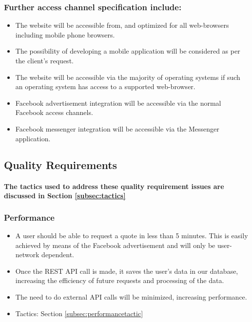 \documentclass{article}
\begin{document}
\subsubsection{Further access channel specification include:}
	\begin{itemize}
		\item The website will be accessible from, and optimized for all web-browsers including mobile phone browsers.
		\item The possibility of developing a mobile application will be considered as per the client's request.
		\item The website will be accessible via the majority of operating systems if such an operating system has access to a supported web-browser.
		\item Facebook advertisement integration will be accessible via the normal Facebook access channels.
		\item Facebook messenger integration will be accessible via the Messenger application.
	\end{itemize}


	\subsection{Quality Requirements}
		\paragraph{The tactics used to address these quality requirement issues are discussed in Section \ref{subsec:tactics}}
		\subsubsection{Performance}
		\begin{itemize}
			\item A user should be able to request a quote in less than 5 minutes. This is easily achieved by means of the Facebook advertisement and will only be user-network dependent.
			\item Once the REST API call is made, it saves the user's data in our database, increasing the efficiency of future requests and processing of the data.
			\item The need to do external API calls will be minimized, increasing performance.
			\item Tactics: Section \ref{subsec:performancetactic}
		\end{itemize}
\end{document}
